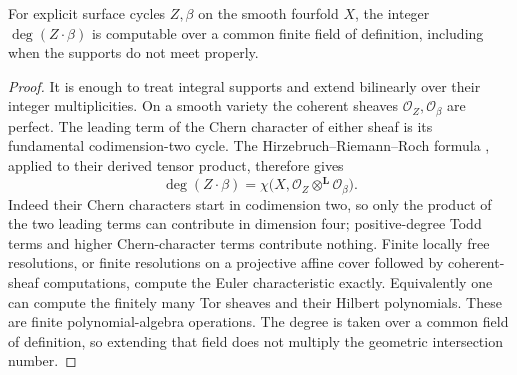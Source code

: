 \begin{lemma}
\label{lem:R40a}
For explicit surface cycles $Z,\beta$ on the smooth fourfold $X$, the
integer $\deg(Z\cdot\beta)$ is computable over a common finite field of
definition, including when the supports do not meet properly.
\end{lemma}
\begin{proof}
It is enough to treat integral supports and extend bilinearly over their
integer multiplicities. On a smooth variety the coherent sheaves
$\mathcal O_Z,\mathcal O_\beta$ are perfect. The leading term of the
Chern character of either sheaf is its fundamental codimension-two
cycle. The Hirzebruch--Riemann--Roch formula
\cite[Corollary 15.2.1, p.~288]{Fulton}, applied to their derived tensor
product, therefore gives
\[
 \deg(Z\cdot\beta)
 =\chi\bigl(X,\mathcal O_Z\mathbin{\otimes^{\mathbf L}}
                         \mathcal O_\beta\bigr).
\]
Indeed their Chern characters start in codimension two, so only the
product of the two leading terms can contribute in dimension four;
positive-degree Todd terms and higher Chern-character terms contribute
nothing. Finite locally free resolutions, or finite resolutions on a
projective affine cover followed by coherent-sheaf computations, compute
the Euler characteristic exactly. Equivalently one can compute the
finitely many Tor sheaves and their Hilbert polynomials. These are finite
polynomial-algebra operations. The degree is taken over a common field
of definition, so extending that field does not multiply the geometric
intersection number.
\end{proof}

